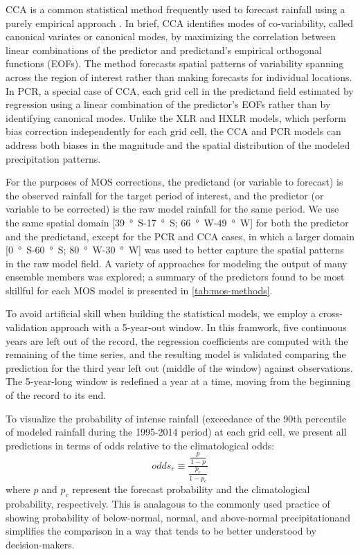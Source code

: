 \documentclass[twocol]{ametsoc}
\begin{document}
CCA is a common statistical method frequently used to forecast rainfall using a purely empirical approach \citep{Mason:2008da,Barnston:2012ce}.
In brief, CCA \citep{Barnston:1992gd,Wilks:2006fx} identifies modes of co-variability, called canonical variates or canonical modes, by maximizing the correlation between linear combinations of the predictor and predictand's empirical orthogonal functions (EOFs).
The method forecasts spatial patterns of variability spanning across the region of interest rather than making forecasts for individual locations.
In PCR, a special case of CCA, each grid cell in the predictand field estimated by regression using a linear combination of the predictor's EOFs \citep{Mason:2008da,Wilks:2006fx} rather than by identifying canonical modes.
Unlike the XLR and HXLR models, which perform bias correction independently for each grid cell, the CCA and PCR models can address both biases in the magnitude and the spatial distribution of the modeled precipitation patterns.

For the purposes of MOS corrections, the predictand (or variable to forecast) is the observed rainfall for the target period of interest, and the predictor (or variable to be corrected) is the raw model rainfall for the same period.
We use the same spatial domain [\SI{39}{\degree S}-\SI{17}{\degree S}; \SI{66}{\degree W}-\SI{49}{\degree W}] for both the predictor and the predictand, except for the PCR and CCA cases, in which a larger domain [\SI{0}{\degree S}-\SI{60}{\degree S}; \SI{80}{\degree W}-\SI{30}{\degree W}] was used to better capture the spatial patterns in the raw model field.
A variety of approaches for modeling the output of many ensemble members was explored; a summary of the predictors found to be most skillful for each MOS model is presented in \cref{tab:mos-methods}.

To avoid artificial skill when building the statistical models, we employ a cross-validation approach with a 5-year-out window.
In this framwork, five continuous years are left out of the record, the regression coefficients are computed with the remaining of the time series, and the resulting model is validated comparing the prediction for the third year left out (middle of the window) against observations.
The 5-year-long window is redefined a year at a time, moving from the beginning of the record to its end.

To visualize the probability of intense rainfall (exceedance of the 90th percentile of modeled rainfall during the 1995-2014 period) at each grid cell, we present all predictions in terms of odds relative to the climatological odds:
\begin{equation} \label{eq:odds-ratio}
odds_{r} \equiv \frac{\frac{p}{1-p}}{\frac{p_c}{1-p_c}}
\end{equation}
where $p$ and $p_c$ represent the forecast probability and the climatological probability, respectively.
This is analagous to the commonly used practice of showing probability of below-normal, normal, and above-normal precipitationand simplifies the comparison in a way that tends to be better understood by decision-makers.
\end{document}

